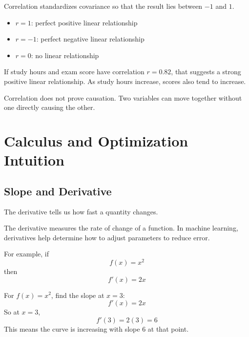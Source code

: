 \documentclass[11pt,a4paper]{article}
\begin{document}
Correlation standardizes covariance so that the result lies between $-1$ and $1$.

\begin{itemize}[leftmargin=*]
  \item $r = 1$: perfect positive linear relationship
  \item $r = -1$: perfect negative linear relationship
  \item $r = 0$: no linear relationship
\end{itemize}

\begin{examplebox}
If study hours and exam score have correlation $r = 0.82$, that suggests a strong positive linear relationship. As study hours increase, scores also tend to increase.
\end{examplebox}

\begin{alertbox}
Correlation does not prove causation. Two variables can move together without one directly causing the other.
\end{alertbox}

\section{Calculus and Optimization Intuition}

\subsection{Slope and Derivative}

The derivative tells us how fast a quantity changes.

\begin{definitionbox}[Derivative]
The derivative measures the rate of change of a function. In machine learning, derivatives help determine how to adjust parameters to reduce error.
\end{definitionbox}

For example, if
\[
f(x) = x^2
\]
then
\[
f'(x) = 2x
\]

\begin{examplebox}
For $f(x) = x^2$, find the slope at $x = 3$:
\[
f'(x) = 2x
\]
So at $x = 3$,
\[
f'(3) = 2(3) = 6
\]
This means the curve is increasing with slope 6 at that point.
\end{examplebox}
\end{document}
